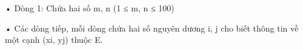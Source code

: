 • Dòng 1: Chứa hai số m, n (1 ≤ m, n ≤ 100)   


   • Các dòng tiếp, mỗi dòng chứa hai số nguyên dương i, j cho biết thông tin về một cạnh (xi, yj) thuộc E.